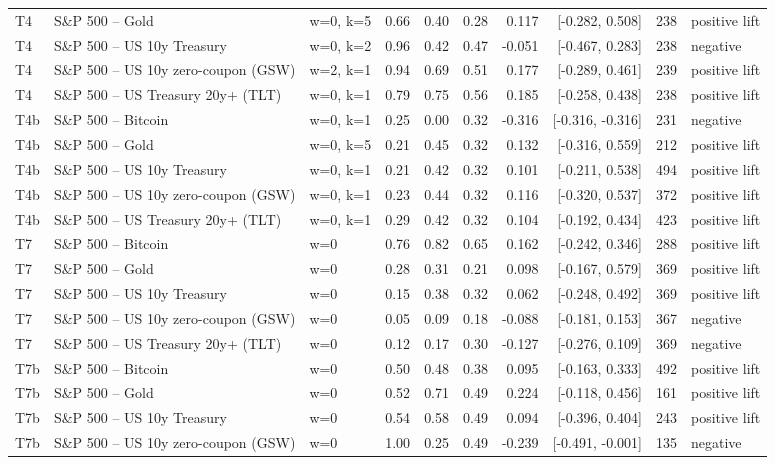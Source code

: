 \begin{figure}
\begin{tabular}{lllrrrrrrl}
T4 & S\&P 500 -- Gold & w=0, k=5 & 0.66 & 0.40 & 0.28 & 0.117 & [-0.282, 0.508] & 238 & positive lift \\
T4 & S\&P 500 -- US 10y Treasury & w=0, k=2 & 0.96 & 0.42 & 0.47 & -0.051 & [-0.467, 0.283] & 238 & negative \\
T4 & S\&P 500 -- US 10y zero-coupon (GSW) & w=2, k=1 & 0.94 & 0.69 & 0.51 & 0.177 & [-0.289, 0.461] & 239 & positive lift \\
T4 & S\&P 500 -- US Treasury 20y+ (TLT) & w=0, k=1 & 0.79 & 0.75 & 0.56 & 0.185 & [-0.258, 0.438] & 238 & positive lift \\
T4b & S\&P 500 -- Bitcoin & w=0, k=1 & 0.25 & 0.00 & 0.32 & -0.316 & [-0.316, -0.316] & 231 & negative \\
T4b & S\&P 500 -- Gold & w=0, k=5 & 0.21 & 0.45 & 0.32 & 0.132 & [-0.316, 0.559] & 212 & positive lift \\
T4b & S\&P 500 -- US 10y Treasury & w=0, k=1 & 0.21 & 0.42 & 0.32 & 0.101 & [-0.211, 0.538] & 494 & positive lift \\
T4b & S\&P 500 -- US 10y zero-coupon (GSW) & w=0, k=1 & 0.23 & 0.44 & 0.32 & 0.116 & [-0.320, 0.537] & 372 & positive lift \\
T4b & S\&P 500 -- US Treasury 20y+ (TLT) & w=0, k=1 & 0.29 & 0.42 & 0.32 & 0.104 & [-0.192, 0.434] & 423 & positive lift \\
T7 & S\&P 500 -- Bitcoin & w=0 & 0.76 & 0.82 & 0.65 & 0.162 & [-0.242, 0.346] & 288 & positive lift \\
T7 & S\&P 500 -- Gold & w=0 & 0.28 & 0.31 & 0.21 & 0.098 & [-0.167, 0.579] & 369 & positive lift \\
T7 & S\&P 500 -- US 10y Treasury & w=0 & 0.15 & 0.38 & 0.32 & 0.062 & [-0.248, 0.492] & 369 & positive lift \\
T7 & S\&P 500 -- US 10y zero-coupon (GSW) & w=0 & 0.05 & 0.09 & 0.18 & -0.088 & [-0.181, 0.153] & 367 & negative \\
T7 & S\&P 500 -- US Treasury 20y+ (TLT) & w=0 & 0.12 & 0.17 & 0.30 & -0.127 & [-0.276, 0.109] & 369 & negative \\
T7b & S\&P 500 -- Bitcoin & w=0 & 0.50 & 0.48 & 0.38 & 0.095 & [-0.163, 0.333] & 492 & positive lift \\
T7b & S\&P 500 -- Gold & w=0 & 0.52 & 0.71 & 0.49 & 0.224 & [-0.118, 0.456] & 161 & positive lift \\
T7b & S\&P 500 -- US 10y Treasury & w=0 & 0.54 & 0.58 & 0.49 & 0.094 & [-0.396, 0.404] & 243 & positive lift \\
T7b & S\&P 500 -- US 10y zero-coupon (GSW) & w=0 & 1.00 & 0.25 & 0.49 & -0.239 & [-0.491, -0.001] & 135 & negative \\

\end{tabular}
\end{figure}
